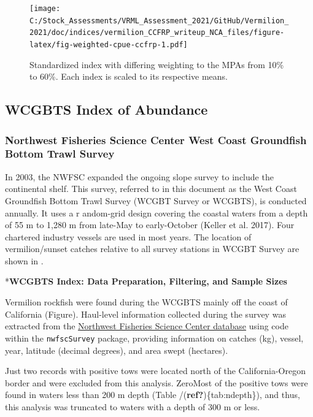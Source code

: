 \documentclass[
  english,
  a4paper,
]{article}
\begin{document}
\begin{figure}
\centering
\texttt{[image: C:/Stock\_Assessments/VRML\_Assessment\_2021/GitHub/Vermilion\_2021/doc/indices/vermilion\_CCFRP\_writeup\_NCA\_files/figure-latex/fig-weighted-cpue-ccfrp-1.pdf]}
\caption{\label{fig:fig-weighted-cpue-ccfrp}Standardized index with differing weighting to the MPAs from 10\% to 60\%. Each index is scaled to its respective means.}
\end{figure}

\clearpage

\hypertarget{wcgbts-index}{%
\subsection{WCGBTS Index of Abundance}\label{wcgbts-index}}

\hypertarget{northwest-fisheries-science-center-west-coast-groundfish-bottom-trawl-survey}{%
\subsubsection{Northwest Fisheries Science Center West Coast Groundfish Bottom Trawl Survey}\label{northwest-fisheries-science-center-west-coast-groundfish-bottom-trawl-survey}}

In 2003, the NWFSC expanded the ongoing slope survey to include the continental
shelf. This survey, referred to in this document as the West Coast Groundfish
Bottom Trawl Survey (WCGBT Survey or WCGBTS), is conducted annually. It uses a r
andom-grid design covering the coastal waters from a depth of 55 m to 1,280 m
from late-May to early-October (Keller et al. 2017). Four chartered industry vessels
are used in most years. The location of vermilion/sunset catches relative to all
survey stations in WCGBT Survey are shown in .

*\textbf{WCGBTS Index: Data Preparation, Filtering, and Sample Sizes}

Vermilion rockfish were found during the WCGBTS mainly off the coast of
California (Figure). Haul-level information collected during the
survey was extracted from the
\href{https://www.webapps.nwfsc.noaa.gov/data}{Northwest Fisheries Science Center database}
using code within the \texttt{nwfscSurvey} package, providing information on
catches (kg),
vessel,
year,
latitude (decimal degrees), and
area swept (hectares).

Just
two
records with positive tows were located north of the California-Oregon border
and were excluded from this analysis.
ZeroMost of the positive tows were found in waters less than 200 m depth
(Table /(\textbf{ref?})\{tab:ndepth\}), and thus,
this analysis was truncated to waters with a depth of 300 m or less.
\end{document}
